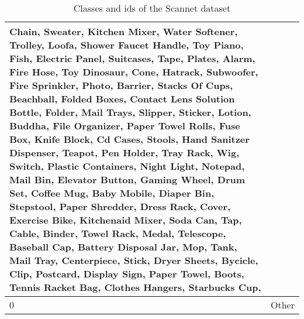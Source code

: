 \begin{table}
\begin{center}
\begin{tabular}{ | l | p{17cm} |}
Chain, Sweater, Kitchen Mixer, Water Softener, Trolley, Loofa, Shower Faucet Handle, Toy Piano, Fish, Electric Panel, Suitcases, Tape, Plates, Alarm, Fire Hose, Toy Dinosaur, Cone, Hatrack, Subwoofer, Fire Sprinkler, Photo, Barrier, Stacks Of Cups, Beachball, Folded Boxes, Contact Lens Solution Bottle, Folder, Mail Trays, Slipper, Sticker, Lotion, Buddha, File Organizer, Paper Towel Rolls, Fuse Box, Knife Block, Cd Cases, Stools, Hand Sanitzer Dispenser, Teapot, Pen Holder, Tray Rack, Wig, Switch, Plastic Containers, Night Light, Notepad, Mail Bin, Elevator Button, Gaming Wheel, Drum Set, Coffee Mug, Baby Mobile, Diaper Bin, Stepstool, Paper Shredder, Dress Rack, Cover, Exercise Bike, Kitchenaid Mixer, Soda Can, Tap, Cable, Binder, Towel Rack, Medal, Telescope, Baseball Cap, Battery Disposal Jar, Mop, Tank, Mail Tray, Centerpiece, Stick, Dryer Sheets, Bycicle, Clip, Postcard, Display Sign, Paper Towel, Boots, Tennis Racket Bag, Clothes Hangers, Starbucks Cup, \\ \hline
    			
    			0 & Other \\ \hline
    			\hline
    			
    			
    		\end{tabular}
    		\caption{Classes and ids of the Scannet dataset}
    		\label{table:Classes in scannet_3}
    	\end{center}
    \end{table}


